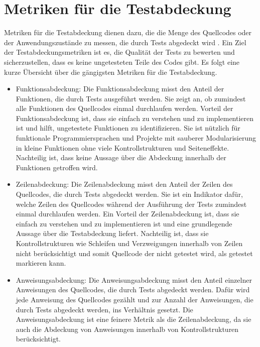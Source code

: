 \section{Metriken für die Testabdeckung}
\label{sec:Foundations:TestCoverageMetrics}

Metriken für die Testabdeckung dienen dazu, die die Menge des Quellcodes oder der Anwendungszustände zu messen, die durch Tests abgedeckt wird \cite{Sommerville10}.
Ein Ziel der Testabdeckungsmetriken ist es, die Qualität der Tests zu bewerten  und sicherzustellen, dass es keine ungetesteten Teile des Codes gibt.
Es folgt eine kurze Übersicht über die gängigsten Metriken für die Testabdeckung.

\begin{itemize}
    \item 
    Funktionsabdeckung: Die Funktionsabdeckung misst den Anteil der Funktionen, die durch Tests ausgeführt werden.
    Sie zeigt an, ob zumindest alle Funktionen des Quellcodes einmal durchlaufen werden.
    Vorteil der Funktionsabdeckung ist, dass sie einfach zu verstehen und zu implementieren ist und hilft, ungetestete Funktionen zu identifizieren.
    Sie ist nützlich für funktionale Programmiersprachen und Projekte mit sauberer Modularisierung in kleine Funktionen ohne viele Kontrollstrukturen und Seiteneffekte.
    Nachteilig ist, dass keine Aussage über die Abdeckung innerhalb der Funktionen getroffen wird.
    \item
    Zeilenabdeckung: Die Zeilenabdeckung misst den Anteil der Zeilen des Quellcodes, die durch Tests abgedeckt werden.
    Sie ist ein Indikator dafür, welche Zeilen des Quellcodes während der Ausführung der Tests zumindest einmal durchlaufen werden.
    Ein Vorteil der Zeilenabdeckung ist, dass sie einfach zu verstehen und zu implementieren ist und eine grundlegende Aussage über die Testabdeckung liefert.
    Nachteilig ist, dass sie Kontrollstrukturen wie Schleifen und Verzweigungen innerhalb von Zeilen nicht berücksichtigt und somit Quellcode der nicht getestet wird, als getestet markieren kann.
    \item
    Anweisungsabdeckung: Die Anweisungsabdeckung misst den Anteil einzelner Anweisungen des Quellcodes, die durch Tests abgedeckt werden.
    Dafür wird jede Anweisung des Quellcodes gezählt und zur Anzahl der Anweisungen, die durch Tests abgedeckt werden, ins Verhältnis gesetzt.
    Die Anweisungsabdeckung ist eine feinere Metrik als die Zeilenabdeckung, da sie auch die Abdeckung von Anweisungen innerhalb von Kontrollstrukturen berücksichtigt.

\end{itemize}
